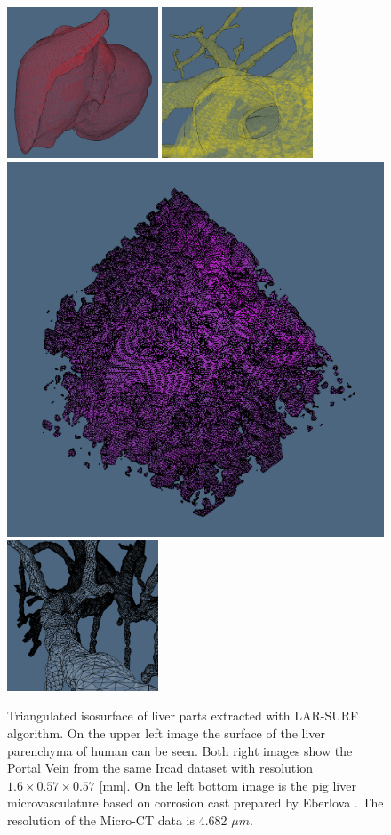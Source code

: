 \documentclass[11pt, oneside]{amsart}   	%
\begin{document}
\begin{figure}
\centering
\includegraphics[width=0.4\textwidth]{figs/liver_01_red_3.png} 
\includegraphics[width=0.4\textwidth]{figs/portalvein_01_yellow_3.png} 
\includegraphics[height=0.4\textwidth]{figs/nrn10_100_low_res.png} 
\includegraphics[width=0.4\textwidth]{figs/porta_smoothing_2.png} 
\caption{
Triangulated isosurface of liver parts extracted with LAR-SURF algorithm. 
On the upper left image the surface of the liver parenchyma of human can be seen. 
Both right images show the Portal Vein from the same Ircad dataset \cite{ircad} 
with resolution $1.6\times0.57\times0.57$ [mm].
On the left bottom image is the pig liver microvasculature based on corrosion cast prepared by Eberlova
\cite{eberlova2017use}. The resolution of the Micro-CT data is 4.682 $\mu{}m$.
} \label{fig:example_liver_macro_micro}
\end{figure}
\end{document}
